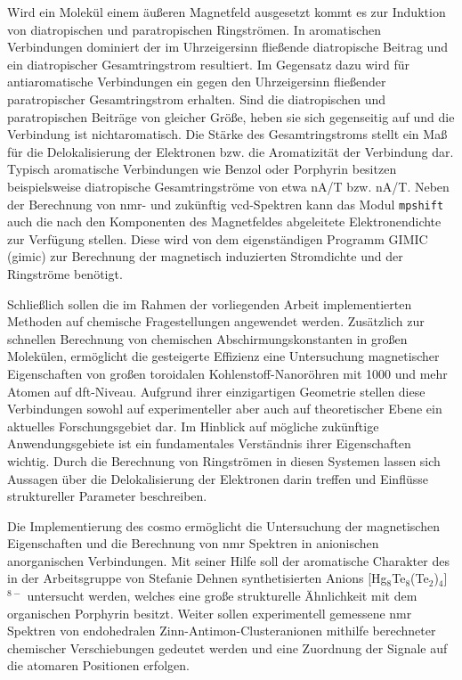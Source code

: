 \bigskip
Wird ein Molekül einem äußeren Magnetfeld ausgesetzt kommt es zur Induktion von diatropischen und paratropischen Ringströmen.\supercite{taubert2011calculation} In aromatischen Verbindungen dominiert der im Uhrzeigersinn fließende diatropische Beitrag und ein diatropischer Gesamtringstrom resultiert. Im Gegensatz dazu wird für antiaromatische Verbindungen ein gegen den Uhrzeigersinn fließender paratropischer Gesamtringstrom erhalten. Sind die diatropischen und paratropischen Beiträge von gleicher Größe, heben sie sich gegenseitig auf und die Verbindung ist nichtaromatisch. Die Stärke des Gesamtringstroms stellt ein Maß für die Delokalisierung der Elektronen bzw. die Aromatizität der Verbindung dar.\supercite{elvidge1961181,pople1966induced} Typisch aromatische Verbindungen wie Benzol oder Porphyrin besitzen beispielsweise diatropische Gesamtringströme von etwa \unit[12]{nA/T} bzw. \unit[27]{nA/T}.\supercite{fliegl2012aromatic} Neben der Berechnung von \ac{nmr}- und zukünftig \ac{vcd}-Spektren kann das Modul \texttt{mpshift} auch die nach den Komponenten des Magnetfeldes abgeleitete Elektronendichte zur Verfügung stellen. Diese wird von dem eigenständigen Programm GIMIC (\acl{gimic})\supercite{juselius2004calculation,taubert2011calculation,fliegl2011gauge,sundholm2016calculations} zur Berechnung der magnetisch induzierten Stromdichte und der Ringströme benötigt.

\bigskip
Schließlich sollen die im Rahmen der vorliegenden Arbeit implementierten Methoden auf chemische Fragestellungen angewendet werden. Zusätzlich zur schnellen Berechnung von chemischen Abschirmungskonstanten in großen Molekülen, ermöglicht die gesteigerte Effizienz eine Untersuchung magnetischer Eigenschaften von großen toroidalen Kohlenstoff-Nanoröhren mit 1000 und mehr Atomen auf \ac{dft}-Niveau. Aufgrund ihrer einzigartigen Geometrie stellen diese Verbindungen sowohl auf experimenteller aber auch auf theoretischer Ebene ein aktuelles Forschungsgebiet dar. Im Hinblick auf mögliche zukünftige Anwendungsgebiete ist ein fundamentales Verständnis ihrer Eigenschaften wichtig. Durch die Berechnung von Ringströmen in diesen Systemen lassen sich Aussagen über die Delokalisierung der Elektronen darin treffen und Einflüsse struktureller Parameter beschreiben. 

Die Implementierung des \ac{cosmo} ermöglicht die Untersuchung der magnetischen Eigenschaften und die Berechnung von \ac{nmr} Spektren in anionischen anorganischen Verbindungen. Mit seiner Hilfe soll der aromatische Charakter des in der Arbeitsgruppe von Stefanie Dehnen synthetisierten Anions [Hg$_8$Te$_8$(Te$_2$)$_4$]$^{8-}$ untersucht werden, welches eine große strukturelle Ähnlichkeit mit dem organischen Porphyrin besitzt. Weiter sollen experimentell gemessene \ac{nmr} Spektren von endohedralen Zinn-Antimon-Clusteranionen mithilfe berechneter chemischer Verschiebungen gedeutet werden und eine Zuordnung der Signale auf die atomaren Positionen erfolgen. 

